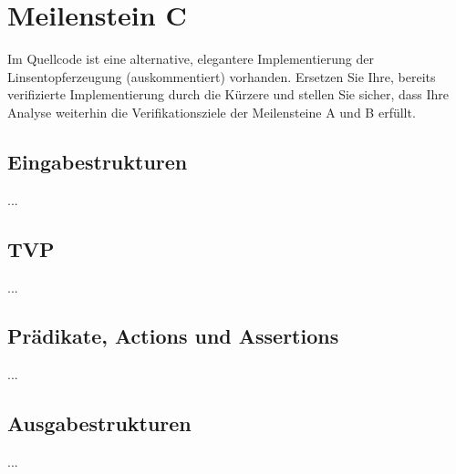 \section{Meilenstein C}
Im Quellcode ist eine alternative, elegantere Implementierung der Linsentopferzeugung (auskommentiert) vorhanden. Ersetzen Sie Ihre, bereits verifizierte Implementierung durch die Kürzere und stellen Sie sicher, dass Ihre Analyse weiterhin die Verifikationsziele der Meilensteine A und B erfüllt.


\subsection{Eingabestrukturen}
...


\subsection{TVP}
...


\subsection{Prädikate, Actions und Assertions}
...


\subsection{Ausgabestrukturen}
...